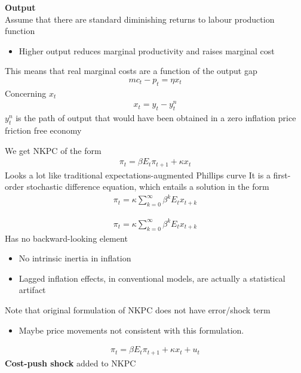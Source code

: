 \documentclass{beamer}
\begin{document}
\begin{frame}
  \textbf{Output}\\
  Assume that there are standard diminishing returns to labour production function
  \begin{itemize}
    \item Higher output reduces marginal productivity and raises marginal cost 
  \end{itemize}
  This means that real marginal costs are a function of the output gap
\begin{align}
  mc_t-p_t=\eta x_t
\end{align}
Concerning $x_t$
\begin{align}
  x_t=y_t-y_t^n
\end{align}
$y_t^n$ is the path of output that would have been obtained in a zero inflation price friction free economy
\end{frame}

\begin{frame}
 We get NKPC of the form
  \begin{align}
  \pi_t=\beta E_t \pi_{t+1} + \kappa x_t
\end{align}
\medskip
 Looks a lot like traditional expectations-augmented Phillips curve
It is a first-order stochastic difference equation, which entails a solution in the form
\begin{align}  
  \pi_t=\kappa \sum_{k=0}^{\infty}\beta^k E_t x_{t+k} 
\end{align}
\end{frame}

\begin{frame}
\begin{align}  
  \pi_t=\kappa \sum_{k=0}^{\infty}\beta^k E_t x_{t+k} 
\end{align}
\medskip
Has no backward-looking element
\begin{itemize}
  \item No intrinsic inertia in inflation
  \item Lagged inflation effects, in conventional models, are actually a statistical artifact
\end{itemize}
\medskip
Note that original formulation of NKPC does not have error/shock term
\begin{itemize}
  \item Maybe price movements not consistent with this formulation.
\end{itemize}
\begin{align}
  \pi_t=\beta E_t \pi_{t+1} + \kappa x_t + u_t
\end{align} 
 \textbf{Cost-push shock} added to NKPC
\end{frame}
\end{document}
